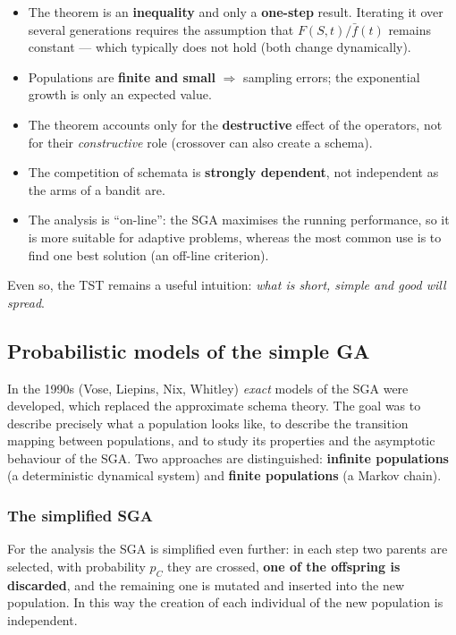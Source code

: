 \documentclass[11pt,a4paper]{article}
\theoremstyle{definition}
\providecommand{\uv}[1]{``#1''}
\begin{document}
\begin{itemize}
\item The theorem is an \textbf{inequality} and only a \textbf{one-step} result.
  Iterating it over several generations requires the assumption that
  $F(S,t)/\bar f(t)$ remains constant --- which typically does not hold (both
  change dynamically).
\item Populations are \textbf{finite and small} $\Rightarrow$ sampling errors;
  the exponential growth is only an expected value.
\item The theorem accounts only for the \textbf{destructive} effect of the
  operators, not for their \emph{constructive} role (crossover can also create a
  schema).
\item The competition of schemata is \textbf{strongly dependent}, not
  independent as the arms of a bandit are.
\item The analysis is \uv{on-line}: the SGA maximises the running performance,
  so it is more suitable for adaptive problems, whereas the most common use is
  to find one best solution (an off-line criterion).
\end{itemize}

Even so, the TST remains a useful intuition: \emph{what is short, simple and
good will spread}.

\subsection{Probabilistic models of the simple GA}
\label{sec:vose}

In the 1990s (Vose, Liepins, Nix, Whitley) \emph{exact} models of the SGA were
developed, which replaced the approximate schema theory. The goal was to
describe precisely what a population looks like, to describe the transition
mapping between populations, and to study its properties and the asymptotic
behaviour of the SGA. Two approaches are distinguished: \textbf{infinite
populations} (a deterministic dynamical system) and \textbf{finite populations}
(a Markov chain).

\subsubsection{The simplified SGA}

For the analysis the SGA is simplified even further: in each step two parents
are selected, with probability $p_C$ they are crossed, \textbf{one of the
offspring is discarded}, and the remaining one is mutated and inserted into the
new population. In this way the creation of each individual of the new
population is independent.
\end{document}
